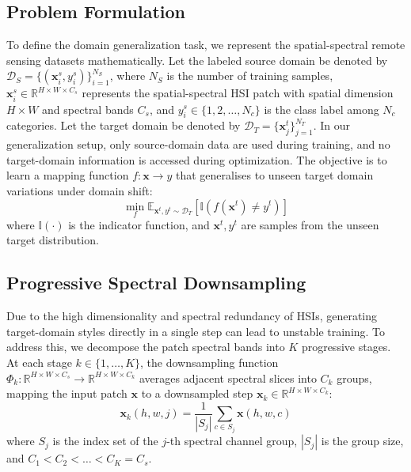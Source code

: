 \subsection{Problem Formulation}
To define the domain generalization task, we represent the spatial-spectral remote sensing datasets mathematically. Let the labeled source domain be denoted by $\mathcal{D}_S = \{(\mathbf{x}_i^s, y_i^s)\}_{i=1}^{N_S}$, where $N_S$ is the number of training samples, $\mathbf{x}_i^s \in \mathbb{R}^{H \times W \times C_s}$ represents the spatial-spectral HSI patch with spatial dimension $H \times W$ and spectral bands $C_s$, and $y_i^s \in \{1, 2, \dots, N_c\}$ is the class label among $N_c$ categories. Let the target domain be denoted by $\mathcal{D}_T = \{\mathbf{x}_j^t\}_{j=1}^{N_T}$. In our generalization setup, only source-domain data are used during training, and no target-domain information is accessed during optimization. The objective is to learn a mapping function $f: \mathbf{x} \to y$ that generalises to unseen target domain variations under domain shift:
\begin{equation}
\min_{f} \mathbb{E}_{\mathbf{x}^t, y^t \sim \mathcal{D}_T} \left[ \mathbb{I}(f(\mathbf{x}^t) \neq y^t) \right]
\end{equation}
where $\mathbb{I}(\cdot)$ is the indicator function, and $\mathbf{x}^t, y^t$ are samples from the unseen target distribution.

\subsection{Progressive Spectral Downsampling}
Due to the high dimensionality and spectral redundancy of HSIs, generating target-domain styles directly in a single step can lead to unstable training. To address this, we decompose the patch spectral bands into $K$ progressive stages. At each stage $k \in \{1, \dots, K\}$, the downsampling function $\Phi_k: \mathbb{R}^{H \times W \times C_s} \to \mathbb{R}^{H \times W \times C_k}$ averages adjacent spectral slices into $C_k$ groups, mapping the input patch $\mathbf{x}$ to a downsampled step $\mathbf{x}_k \in \mathbb{R}^{H \times W \times C_k}$:
\begin{equation}
\mathbf{x}_k(h, w, j) = \frac{1}{|S_j|} \sum_{c \in S_j} \mathbf{x}(h, w, c)
\end{equation}
where $S_j$ is the index set of the $j$-th spectral channel group, $|S_j|$ is the group size, and $C_1 < C_2 < \dots < C_K = C_s$.

